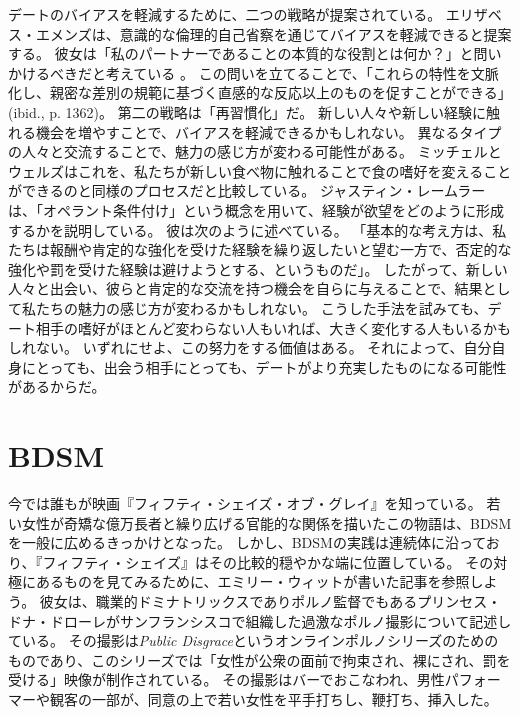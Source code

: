 \documentclass[paper=a4,book,openany]{jlreq} \usepackage{mystyle}
\begin{document}
デートのバイアスを軽減するために、二つの戦略が提案されている。
エリザベス・エメンズは、意識的な倫理的自己省察を通じてバイアスを軽減できると提案する。
彼女は「私のパートナーであることの本質的な役割とは何か？」と問いかけるべきだと考えている \citep[p. 1360]{emens09:_intim_discr}。
この問いを立てることで、「これらの特性を文脈化し、親密な差別の規範に基づく直感的な反応以上のものを促すことができる」(ibid., p. 1362)。
第二の戦略は「再習慣化」だ。
新しい人々や新しい経験に触れる機会を増やすことで、バイアスを軽減できるかもしれない。
異なるタイプの人々と交流することで、魅力の感じ方が変わる可能性がある。
ミッチェルとウェルズはこれを、私たちが新しい食べ物に触れることで食の嗜好を変えることができるのと同様のプロセスだと比較している\citep{mitchell18:_race_roman_attrac_datin}。
ジャスティン・レームラーは、「オペラント条件付け」という概念を用いて、経験が欲望をどのように形成するかを説明している。
彼は次のように述べている。
「基本的な考え方は、私たちは報酬や肯定的な強化を受けた経験を繰り返したいと望む一方で、否定的な強化や罰を受けた経験は避けようとする、というものだ」\citep{lehmiller19:_where_do_our_sexual_attrac_come_from}。
したがって、新しい人々と出会い、彼らと肯定的な交流を持つ機会を自らに与えることで、結果として私たちの魅力の感じ方が変わるかもしれない。
こうした手法を試みても、デート相手の嗜好がほとんど変わらない人もいれば、大きく変化する人もいるかもしれない。
いずれにせよ、この努力をする価値はある。
それによって、自分自身にとっても、出会う相手にとっても、デートがより充実したものになる可能性があるからだ。

\section{BDSM}

今では誰もが映画『フィフティ・シェイズ・オブ・グレイ』を知っている。
若い女性が奇矯な億万長者と繰り広げる官能的な関係を描いたこの物語は、BDSMを一般に広めるきっかけとなった。
しかし、BDSMの実践は連続体に沿っており、『フィフティ・シェイズ』はその比較的穏やかな端に位置している。
その対極にあるものを見てみるために、エミリー・ウィットが書いた記事を参照しよう。
彼女は、職業的ドミナトリックスでありポルノ監督でもあるプリンセス・ドナ・ドローレがサンフランシスコで組織した過激なポルノ撮影について記述している。
その撮影は\emph{Public Disgrace}というオンラインポルノシリーズのためのものであり、このシリーズでは「女性が公衆の面前で拘束され、裸にされ、罰を受ける」映像が制作されている。
その撮影はバーでおこなわれ、男性パフォーマーや観客の一部が、同意の上で若い女性を平手打ちし、鞭打ち、挿入した\citep{witt13:_what_do_you_desir}。
\end{document}
